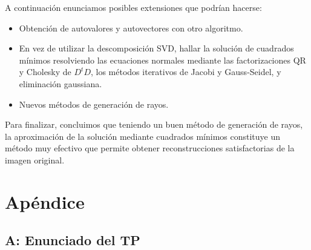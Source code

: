 \documentclass[a4paper]{article}
\begin{document}
A continuación enunciamos posibles extensiones que podrían hacerse:

\begin{itemize}
\item Obtención de autovalores y autovectores con otro algoritmo.
\item En vez de utilizar la descomposición SVD, hallar la solución de cuadrados mínimos resolviendo las ecuaciones normales mediante las 
factorizaciones QR y Cholesky de $D^tD$, los métodos iterativos de Jacobi y Gauss-Seidel, y eliminación gaussiana.
\item Nuevos métodos de generación de rayos.
\end{itemize}

Para finalizar, concluimos que teniendo un buen método de generación de rayos, la aproximación de la solución mediante cuadrados mínimos constituye 
un método muy efectivo que permite obtener reconstrucciones satisfactorias de la imagen original.






\newpage

\section{Apéndice}

\subsection*{A: Enunciado del TP}
\end{document}
